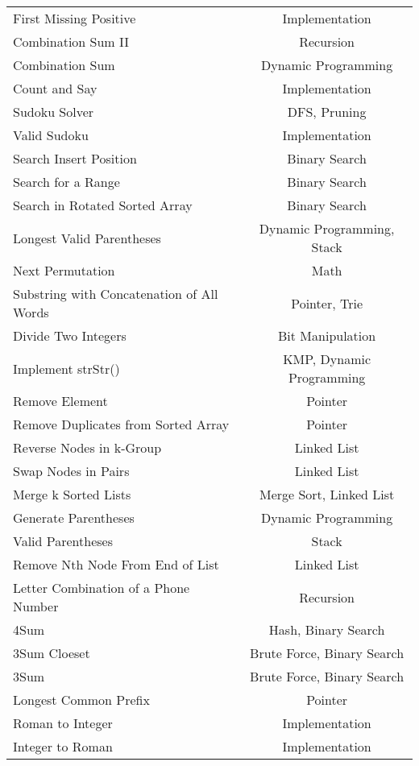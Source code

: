 \documentclass[paper=a4, fontsize=11pt]{scrartcl} %
\begin{document}
\begin{center}
\begin{longtable}{|l|c|}
    First Missing Positive  &   Implementation  \\
    Combination Sum II  &   Recursion  \\
    Combination Sum &   Dynamic Programming \\
    Count and Say   &   Implementation  \\
    Sudoku Solver   &   DFS, Pruning \\
    Valid Sudoku    &   Implementation \\
    Search Insert Position  &   Binary Search   \\
    Search for a Range  &   Binary Search   \\
    Search in Rotated Sorted Array  &   Binary Search   \\
    Longest Valid Parentheses   &   Dynamic Programming, Stack   \\
    Next Permutation    &   Math    \\
    Substring with Concatenation of All Words   &   Pointer, Trie \\
    Divide Two Integers &   Bit Manipulation    \\
    Implement strStr()  &   KMP, Dynamic Programming  \\
    Remove Element  &   Pointer \\
    Remove Duplicates from Sorted Array &   Pointer \\
    Reverse Nodes in k-Group    &   Linked List \\
    Swap Nodes in Pairs     &   Linked List \\
    Merge k Sorted Lists    &   Merge Sort, Linked List\\
    Generate Parentheses    &   Dynamic Programming \\
    Valid Parentheses   &   Stack   \\
    Remove Nth Node From End of List    &   Linked List \\
    Letter Combination of a Phone Number    &   Recursion \\
    4Sum    &   Hash, Binary Search \\
    3Sum Cloeset    &   Brute Force, Binary Search \\
    3Sum    &   Brute Force, Binary Search \\
    Longest Common Prefix   &   Pointer \\
    Roman to Integer    &   Implementation  \\
    Integer to Roman    &   Implementation  \\

\end{longtable}
\end{center}
\end{document}
